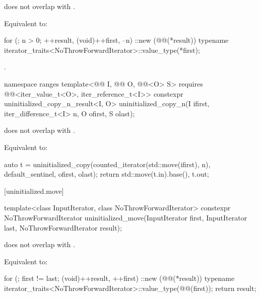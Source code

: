\begin{itemdescr}
\pnum
\expects
{} does not overlap with .

\pnum
\effects
Equivalent to:
\begin{codeblock}
for (; n > 0; ++result, (void)++first, --n)
  ::new (@@(*result))
    typename iterator_traits<NoThrowForwardIterator>::value_type(*first);
\end{codeblock}

\pnum
\returns
{}.
\end{itemdescr}

%
\begin{itemdecl}
namespace ranges {
  template<@@ I, @@ O, @@<O> S>
    requires @@<iter_value_t<O>, iter_reference_t<I>>
    constexpr uninitialized_copy_n_result<I, O>
      uninitialized_copy_n(I ifirst, iter_difference_t<I> n, O ofirst, S olast);
}
\end{itemdecl}

\begin{itemdescr}
\pnum
\expects
{} does not overlap with
.

\pnum
\effects
Equivalent to:
\begin{codeblock}
auto t = uninitialized_copy(counted_iterator(std::move(ifirst), n),
                            default_sentinel, ofirst, olast);
return {std::move(t.in).base(), t.out};
\end{codeblock}
\end{itemdescr}

[uninitialized.move]{}

%
\begin{itemdecl}
template<class InputIterator, class NoThrowForwardIterator>
  constexpr NoThrowForwardIterator uninitialized_move(InputIterator first, InputIterator last,
                                                      NoThrowForwardIterator result);
\end{itemdecl}

\begin{itemdescr}
\pnum
\expects
{} does not overlap with .

\pnum
\effects
Equivalent to:
\begin{codeblock}
for (; first != last; (void)++result, ++first)
  ::new (@@(*result))
    typename iterator_traits<NoThrowForwardIterator>::value_type(@@(first));
return result;
\end{codeblock}
\end{itemdescr}

